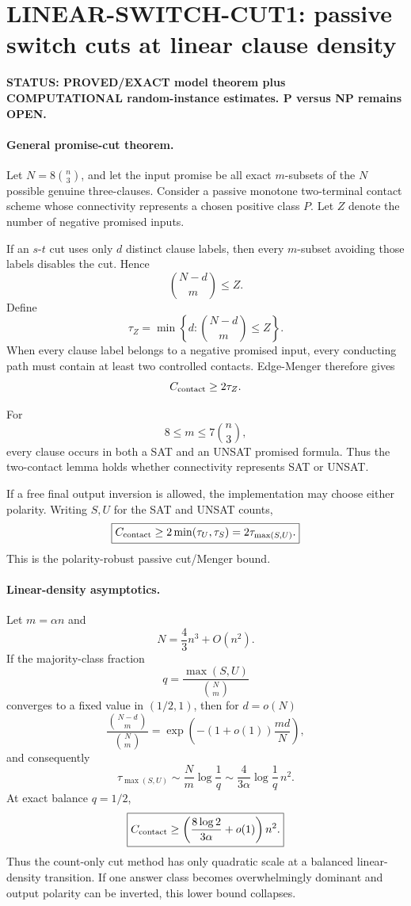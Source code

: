 \section*{LINEAR-SWITCH-CUT1: passive switch cuts at linear clause density}

\textbf{STATUS: PROVED/EXACT model theorem plus COMPUTATIONAL random-instance estimates. P versus NP remains OPEN.}

\paragraph{General promise-cut theorem.}
Let \(N=8\binom n3\), and let the input promise be all exact \(m\)-subsets of the \(N\)
possible genuine three-clauses. Consider a passive monotone two-terminal contact scheme whose
connectivity represents a chosen positive class \(P\). Let \(Z\) denote the number of negative
promised inputs.

If an \(s\)-\(t\) cut uses only \(d\) distinct clause labels, then every \(m\)-subset avoiding
those labels disables the cut. Hence
\[
\binom{N-d}{m}\le Z.
\]
Define
\[
\tau_Z=\min\left\{d:\binom{N-d}{m}\le Z\right\}.
\]
When every clause label belongs to a negative promised input, every conducting path must contain
at least two controlled contacts. Edge-Menger therefore gives
\[
C_{\rm contact}\ge2\tau_Z.
\]

For
\[
8\le m\le 7\binom n3,
\]
every clause occurs in both a SAT and an UNSAT promised formula. Thus the two-contact lemma
holds whether connectivity represents SAT or UNSAT.

If a free final output inversion is allowed, the implementation may choose either polarity.
Writing \(S,U\) for the SAT and UNSAT counts,
\[
\boxed{
C_{\rm contact}\ge
2\min(\tau_U,\tau_S)
=
2\tau_{\max(S,U)}.
}
\]
This is the polarity-robust passive cut/Menger bound.

\paragraph{Linear-density asymptotics.}
Let \(m=\alpha n\) and
\[
N=\frac43n^3+O(n^2).
\]
If the majority-class fraction
\[
q=\frac{\max(S,U)}{\binom Nm}
\]
converges to a fixed value in \((1/2,1)\), then for \(d=o(N)\)
\[
\frac{\binom{N-d}{m}}{\binom Nm}
=
\exp\left(-(1+o(1))\frac{md}{N}\right),
\]
and consequently
\[
\tau_{\max(S,U)}
\sim
\frac{N}{m}\log\frac1q
\sim
\frac{4}{3\alpha}\log\frac1q\,n^2.
\]
At exact balance \(q=1/2\),
\[
\boxed{
C_{\rm contact}
\ge
\left(\frac{8\log2}{3\alpha}+o(1)\right)n^2.
}
\]
Thus the count-only cut method has only quadratic scale at a balanced linear-density transition.
If one answer class becomes overwhelmingly dominant and output polarity can be inverted, this
lower bound collapses.

